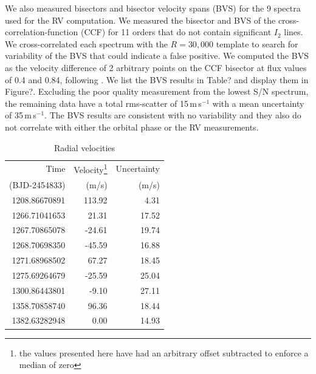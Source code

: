 \documentclass[apjl]{emulateapj}
\begin{document}
We also measured bisectors and bisector velocity spans (BVS) for the 9 spectra used for the RV computation. We measured the bisector and BVS of the cross-correlation-function (CCF) for 11 orders that do not contain significant $I_2$ lines. We cross-correlated each spectrum with the $R=30,000$ template to search for variability of the BVS that could indicate a false positive. We computed the BVS as the velocity difference of 2 arbitrary points on the CCF bisector at flux values of 0.4 and 0.84, following \citet{hatzes98}. We list the BVS results in Table? and display them in Figure?. Excluding the poor
quality measurement from the lowest S/N spectrum, the remaining data have a total rms-scatter of 15\,m\,s$^{-1}$ with a mean uncertainty of 35\,m\,s$^{-1}$. The BVS results are consistent with no variability and they also do not correlate with either the orbital phase or the RV measurements.





\begin{table}\label{tab:rv}
\centering
\caption{Radial velocities}
\begin{tabular}{r r r}
Time & Velocity\footnote{the values presented here have had an arbitrary offset subtracted to enforce a median of zero}  & Uncertainty \\
(BJD-2454833) & (m/s) & (m/s)\\
\hline
1208.86670891	&	113.92 & 4.31\\
1266.71041653	& 21.31&17.52\\
1267.70865078		&	-24.61 &19.74\\
1268.70698350		&	-45.59&16.88\\
1271.68968502		&	67.27&18.45\\
1275.69264679	&	-25.59&25.04\\
1300.86443801 & -9.10&27.11\\
1358.70858740 & 96.36&18.44\\
1382.63282948 & 0.00&14.93\\
\hline
\end{tabular}
\end{table}
\end{document}
